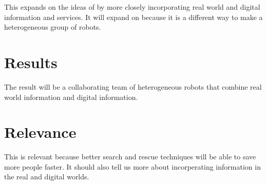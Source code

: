 \documentclass[a4paper,10pt]{article}
\begin{document}
This expands on the ideas of
\citet{intframe} by more closely incorporating real world and digital
information and services. It will expand on \citet{selforg} because it is a
different way to make a heterogeneous group of robots.

\section*{Results}
The result will be a collaborating team of heterogeneous robots that
combine real world information and digital information. 

\section*{Relevance}
This is relevant because better search and rescue techniques will be able
to save more people faster. It should also tell us more about incorperating
information in the real and digital worlds. 



\end{document}
